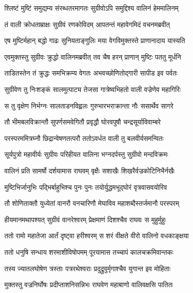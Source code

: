 \twolineshloka
{श्लिष्टं मुष्टिं समुद्यम्य संरब्धतरमागतः}
{सुग्रीवोऽपि समुद्दिश्य वालिनं हेममालिनम्} %

\twolineshloka
{तं वाली क्रोधताम्राक्षः सुग्रीवं रणकोविदम्}
{आपतन्तं महावेगमिदं वचनमब्रवीत्} %

\twolineshloka
{एष मुष्टिर्महान् बद्धो गाढः सुनियताङ्गुलिः}
{मया वेगविमुक्तस्ते प्राणानादाय यास्यति} %

\twolineshloka
{एवमुक्तस्तु सुग्रीवः क्रुद्धो वालिनमब्रवीत्}
{तव चैष हरन् प्राणान् मुष्टिः पततु मूर्धनि} %

\twolineshloka
{ताडितस्तेन तं क्रुद्धः समभिक्रम्य वेगतः}
{अभवच्छोणितोद्गारी सापीड इव पर्वतः} %

\twolineshloka
{सुग्रीवेण तु निःशङ्कं सालमुत्पाट्य तेजसा}
{गात्रेष्वभिहतो वाली वज्रेणेव महागिरिः} %

\twolineshloka
{स तु वृक्षेण निर्भग्नः सालताडनविह्वलः}
{गुरुभारभराक्रान्ता नौः ससार्थेव सागरे} %

\twolineshloka
{तौ भीमबलविक्रान्तौ सुपर्णसमवेगितौ}
{प्रवृद्धौ घोरवपुषौ चन्द्रसूर्याविवाम्बरे} %

\twolineshloka
{परस्परममित्रघ्नौ छिद्रान्वेषणतत्परौ}
{ततोऽवर्धत वाली तु बलवीर्यसमन्वितः} %

\twolineshloka
{सूर्यपुत्रो महावीर्यः सुग्रीवः परिहीयत}
{वालिना भग्नदर्पस्तु सुग्रीवो मन्दविक्रमः} %

\twolineshloka
{वालिनं प्रति सामर्षो दर्शयामास राघवम्}
{वृक्षैः सशाखैः शिखरैर्वज्रकोटिनिभैर्नखैः} %

\twolineshloka
{मुष्टिभिर्जानुभिः पद्भिर्बाहुभिश्च पुनः पुनः}
{तयोर्युद्धमभूद्घोरं वृत्रवासवयोरिव} %

\twolineshloka
{तौ शोणिताक्तौ युध्येतां वानरौ वनचारिणौ}
{मेघाविव महाशब्दैस्तर्जमानौ परस्परम्} %

\twolineshloka
{हीयमानमथापश्यत् सुग्रीवं वानरेश्वरम्}
{प्रेक्षमाणं दिशश्चैव राघवः स मुहुर्मुहुः} %

\twolineshloka
{ततो रामो महातेजा आर्तं दृष्ट्वा हरीश्वरम्}
{स शरं वीक्षते वीरो वालिनो वधकाङ्क्षया} %

\twolineshloka
{ततो धनुषि सन्धाय शरमाशीविषोपमम्}
{पूरयामास तच्चापं कालचक्रमिवान्तकः} %

\twolineshloka
{तस्य ज्यातलघोषेण त्रस्ताः पत्ररथेश्वराः}
{प्रदुद्रुवुर्मृगाश्चैव युगान्त इव मोहिताः} %

\twolineshloka
{मुक्तस्तु वज्रनिर्घोषः प्रदीप्ताशनिसन्निभः}
{राघवेण महाबाणो वालिवक्षसि पातितः} %

